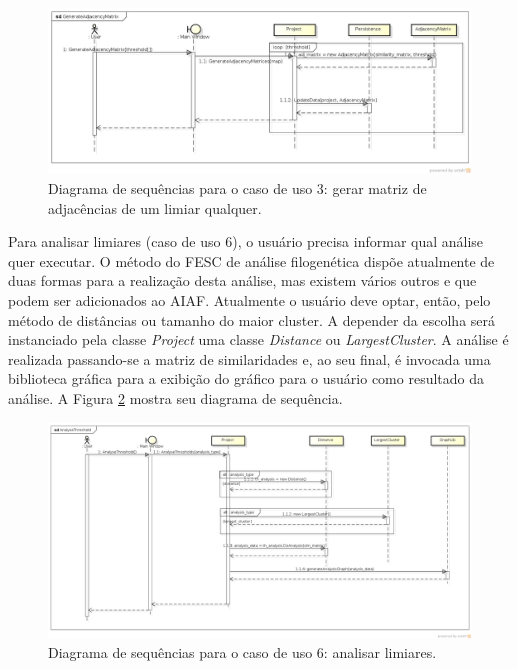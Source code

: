 \begin{figure}
\centering
\includegraphics[scale=0.42]{generate-adjacency-matrix}
\caption{Diagrama de sequências para o caso de uso 3: gerar matriz de adjacências de um limiar qualquer.}
\label{fig:generate-adjacency-matrix}
\end{figure}

Para analisar limiares (caso de uso 6),
o usuário precisa informar qual análise quer executar. O método do FESC de análise filogenética dispõe atualmente de duas formas
para a realização desta análise, mas existem vários outros e que podem ser adicionados ao AIAF. Atualmente o usuário deve optar, então, pelo método de
distâncias ou tamanho do maior cluster. A depender da escolha será instanciado pela classe \textit{Project} uma classe \textit{Distance} ou
\textit{LargestCluster}. A análise é realizada passando-se a matriz de similaridades e, ao seu final, é invocada uma biblioteca gráfica
para a exibição do gráfico para o usuário como resultado da análise. A Figura \ref{fig:analyse-threshold} mostra seu diagrama de sequência.

\begin{figure}
\centering
\includegraphics[scale=0.34]{analyse-threshold}
\caption{Diagrama de sequências para o caso de uso 6: analisar limiares.}
\label{fig:analyse-threshold}
\end{figure}

